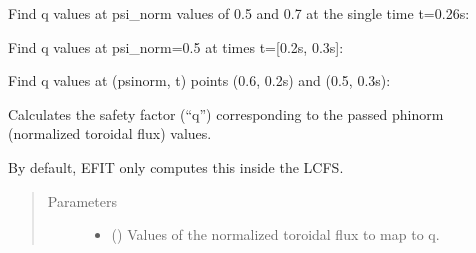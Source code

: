 \documentclass[letterpaper,10pt,english]{sphinxmanual}
\begin{document}
\begin{fulllineitems}
\begin{fulllineitems}
Find q values at psi\_norm values of 0.5 and 0.7 at the single time
t=0.26s:

\begin{sphinxVerbatim}[commandchars=\\\{\}]
  \PYG{p}{[} \PYG{p}{]} 
\end{sphinxVerbatim}

Find q values at psi\_norm=0.5 at times t={[}0.2s, 0.3s{]}:

\begin{sphinxVerbatim}[commandchars=\\\{\}]
   \PYG{p}{[} \PYG{p}{]}
\end{sphinxVerbatim}

Find q values at (psinorm, t) points (0.6, 0.2s) and (0.5, 0.3s):

\begin{sphinxVerbatim}[commandchars=\\\{\}]
  \PYG{p}{[} \PYG{p}{]} \PYG{p}{[} \PYG{p}{]} 
\end{sphinxVerbatim}

\end{fulllineitems}


\begin{fulllineitems}
\label{\detokenize{eqtools:eqtools.core.Equilibrium.phinorm2q}}
Calculates the safety factor (“q”) corresponding to the passed phinorm (normalized toroidal flux) values.

By default, EFIT only computes this inside the LCFS.
\begin{quote}\begin{description}
\item[{Parameters}] \leavevmode\begin{itemize}
\item {} 
 () \textendash{} Values of the normalized
toroidal flux to map to q.


\end{itemize}
\end{description}
\end{quote}
\end{fulllineitems}
\end{fulllineitems}
\end{document}

